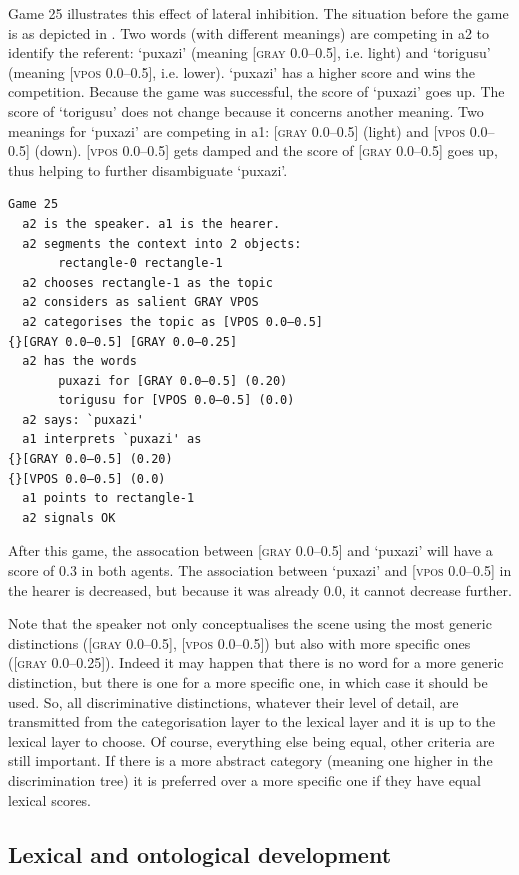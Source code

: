Game 25 illustrates this effect of 
lateral inhibition. The situation before the game is 
as depicted in . 
Two words (with different meanings) are competing in {\bfshape  a2} to 
identify the referent: `puxazi' (meaning 
{}[\textsc{gray} 0.0–0.5], i.e. light) and `torigusu'
(meaning [\textsc{vpos} 0.0–0.5], i.e. lower).  `puxazi' has
a higher score and wins the competition. Because the game 
was successful, the score
of `puxazi' goes up. The score of `torigusu' 
does not change because it concerns another 
meaning. Two meanings for `puxazi'
are competing in {\bfshape  a1}: [\textsc{gray} 0.0–0.5] (light)
and [\textsc{vpos} 0.0–0.5] (down). [\textsc{vpos} 0.0–0.5] gets damped and 
the score of [\textsc{gray} 0.0–0.5] goes up, thus helping to 
further disambiguate `puxazi'. 
\begin{verbatim}
Game 25
  a2 is the speaker. a1 is the hearer. 
  a2 segments the context into 2 objects: 
       rectangle-0 rectangle-1 
  a2 chooses rectangle-1 as the topic 
  a2 considers as salient GRAY VPOS
  a2 categorises the topic as [VPOS 0.0–0.5] 
{}[GRAY 0.0–0.5] [GRAY 0.0–0.25]
  a2 has the words
       puxazi for [GRAY 0.0–0.5] (0.20)
       torigusu for [VPOS 0.0–0.5] (0.0)
  a2 says: `puxazi'
  a1 interprets `puxazi' as
{}[GRAY 0.0–0.5] (0.20)
{}[VPOS 0.0–0.5] (0.0)
  a1 points to rectangle-1
  a2 signals OK
\end{verbatim}
After this game, the assocation between [\textsc{gray} 0.0–0.5] 
and `puxazi' will have a score of 0.3 in both agents. 
The association between `puxazi' and [\textsc{vpos} 0.0–0.5] 
in the hearer is decreased, but because it was already 
0.0, it cannot decrease further. 

Note that the speaker not only conceptualises the scene using 
the most generic distinctions ([\textsc{gray} 0.0–0.5], 
{}[\textsc{vpos} 0.0–0.5]) but also
with more specific ones ([\textsc{gray} 0.0–0.25]). Indeed it 
may happen that there is no word for a more generic 
distinction, but there is one for a more specific 
one, in which case it should be used. 
So, all discriminative distinctions, 
whatever their level of detail, are
transmitted from the categorisation layer to the 
lexical layer and it is up to the lexical layer
to choose. Of course, everything else being equal, 
other criteria are still important. If there is a 
more abstract category (meaning one higher in the 
discrimination tree) it is preferred over a more 
specific one if they have equal lexical scores. 

\subsection{Lexical and ontological development} 

